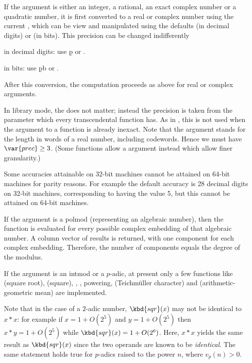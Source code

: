 \item If the argument is either an integer, a rational, an exact complex
number or a quadratic number, it is first converted to a real
or complex number using the current , which can be
view and manipulated using the defaults  (in decimal
digits) or  (in bits). This precision can be changed
indifferently

\item in decimal digits: use \b{p} or .

\item in bits: use \b{pb} or .

After this conversion, the computation proceeds as above for real or complex
arguments.

In library mode, the  does not matter; instead the
precision is taken from the  parameter which every transcendental
function has. As in , this  is not used when the argument
to a function is already inexact. Note that the argument  stands
for the length in words of a real number, including codewords. Hence we must
have $\var{prec} \geq 3$. (Some functions allow a  argument
instead which allow finer granularity.)

Some accuracies attainable on 32-bit machines cannot be attained
on 64-bit machines for parity reasons. For example the default  accuracy
is 28 decimal digits on 32-bit machines, corresponding to  having
the value 5, but this cannot be attained on 64-bit machines.

\item If the argument is a polmod (representing an algebraic number),
then the function is evaluated for every possible complex embedding of that
algebraic number.  A column vector of results is returned, with one component
for each complex embedding.  Therefore, the number of components equals
the degree of the  modulus.

\item If the argument is an intmod or a $p$-adic, at present only a
few functions like  (square root),  (square), ,
, powering,  (Teichm\"uller character) and
 (arithmetic-geometric mean) are implemented.

Note that in the case of a $2$-adic number, $\kbd{sqr}(x)$ may not be
identical to $x*x$: for example if $x = 1+O(2^5)$ and $y = 1+O(2^5)$ then
$x*y = 1+O(2^5)$ while $\kbd{sqr}(x) = 1+O(2^6)$. Here, $x * x$ yields the
same result as $\kbd{sqr}(x)$ since the two operands are known to be
\emph{identical}. The same statement holds true for $p$-adics raised to the
power $n$, where $v_p(n) > 0$.


